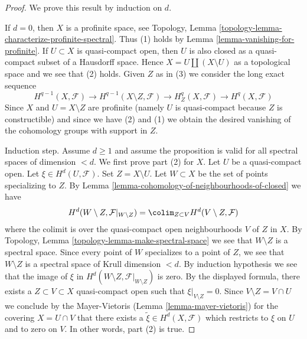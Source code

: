 \begin{proof}
We prove this result by induction on $d$.

\medskip\noindent
If $d = 0$, then $X$ is a profinite space, see
Topology, Lemma \ref{topology-lemma-characterize-profinite-spectral}.
Thus (1) holds by Lemma \ref{lemma-vanishing-for-profinite}.
If $U \subset X$ is quasi-compact open, then $U$ is
also closed as a quasi-compact subset of a Hausdorff space.
Hence $X = U \amalg (X \setminus U)$ as a topological space
and we see that (2) holds. Given $Z$ as in (3) we consider the
long exact sequence
$$
H^{q - 1}(X, \mathcal{F}) \to
H^{q - 1}(X \setminus Z, \mathcal{F}) \to
H^q_Z(X, \mathcal{F}) \to H^q(X, \mathcal{F})
$$
Since $X$ and $U = X \setminus Z$ are profinite (namely $U$ is quasi-compact
because $Z$ is constructible) and since
we have (2) and (1) we obtain the desired vanishing of the
cohomology groups with support in $Z$.

\medskip\noindent
Induction step. Assume $d \geq 1$ and assume
the proposition is valid for all spectral
spaces of dimension $< d$. We first prove part (2) for $X$.
Let $U$ be a quasi-compact open. Let $\xi \in H^d(U, \mathcal{F})$.
Set $Z = X \setminus U$. Let $W \subset X$ be the set of points
specializing to $Z$. By
Lemma \ref{lemma-cohomology-of-neighbourhoods-of-closed} we have
$$
H^d(W \setminus Z, \mathcal{F}|_{W \setminus Z}) =
\colim_{Z \subset V} H^d(V \setminus Z, \mathcal{F})
$$
where the colimit is over the quasi-compact open neighbourhoods $V$
of $Z$ in $X$.
By Topology, Lemma \ref{topology-lemma-make-spectral-space} we see that
$W \setminus Z$ is a spectral space.
Since every point of $W$ specializes to a point of $Z$, we see that
$W \setminus Z$ is a spectral space of Krull dimension $< d$.
By induction hypothesis we see that the image of $\xi$ in
$H^d(W \setminus Z, \mathcal{F}|_{W \setminus Z})$ is zero.
By the displayed formula, there exists a $Z \subset V \subset X$
quasi-compact open such that $\xi|_{V \setminus Z} = 0$.
Since $V \setminus Z = V \cap U$ we conclude by the Mayer-Vietoris
(Lemma \ref{lemma-mayer-vietoris}) for the covering $X = U \cap V$
that there exists a $\tilde \xi \in H^d(X, \mathcal{F})$ which restricts
to $\xi$ on $U$ and to zero on $V$. In other words, part (2) is true.


\end{proof}
